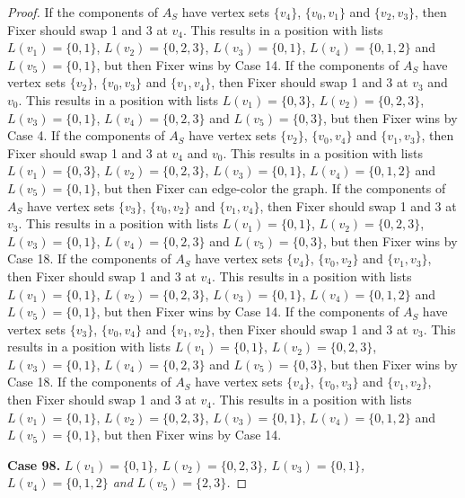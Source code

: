\documentclass[12pt]{amsart}
\theoremstyle{plain}
\theoremstyle{definition}
\theoremstyle{remark}
\begin{document}
\begin{proof}
If the components of $A_S$ have vertex sets $\{v_4\}$, $\{v_0, v_1\}$ and $\{v_2, v_3\}$, then Fixer should swap 1 and 3 at $v_4$. This results in a position with lists $L(v_1) = \{0, 1\}$, $L(v_2) = \{0, 2, 3\}$, $L(v_3) = \{0, 1\}$, $L(v_4) = \{0, 1, 2\}$ and $L(v_5) = \{0, 1\}$, but then Fixer wins by Case 14.
If the components of $A_S$ have vertex sets $\{v_2\}$, $\{v_0, v_3\}$ and $\{v_1, v_4\}$, then Fixer should swap 1 and 3 at $v_3$ and $v_0$. This results in a position with lists $L(v_1) = \{0, 3\}$, $L(v_2) = \{0, 2, 3\}$, $L(v_3) = \{0, 1\}$, $L(v_4) = \{0, 2, 3\}$ and $L(v_5) = \{0, 3\}$, but then Fixer wins by Case 4.
If the components of $A_S$ have vertex sets $\{v_2\}$, $\{v_0, v_4\}$ and $\{v_1, v_3\}$, then Fixer should swap 1 and 3 at $v_4$ and $v_0$. This results in a position with lists $L(v_1) = \{0, 3\}$, $L(v_2) = \{0, 2, 3\}$, $L(v_3) = \{0, 1\}$, $L(v_4) = \{0, 1, 2\}$ and $L(v_5) = \{0, 1\}$, but then Fixer can edge-color the graph.
If the components of $A_S$ have vertex sets $\{v_3\}$, $\{v_0, v_2\}$ and $\{v_1, v_4\}$, then Fixer should swap 1 and 3 at $v_3$. This results in a position with lists $L(v_1) = \{0, 1\}$, $L(v_2) = \{0, 2, 3\}$, $L(v_3) = \{0, 1\}$, $L(v_4) = \{0, 2, 3\}$ and $L(v_5) = \{0, 3\}$, but then Fixer wins by Case 18.
If the components of $A_S$ have vertex sets $\{v_4\}$, $\{v_0, v_2\}$ and $\{v_1, v_3\}$, then Fixer should swap 1 and 3 at $v_4$. This results in a position with lists $L(v_1) = \{0, 1\}$, $L(v_2) = \{0, 2, 3\}$, $L(v_3) = \{0, 1\}$, $L(v_4) = \{0, 1, 2\}$ and $L(v_5) = \{0, 1\}$, but then Fixer wins by Case 14.
If the components of $A_S$ have vertex sets $\{v_3\}$, $\{v_0, v_4\}$ and $\{v_1, v_2\}$, then Fixer should swap 1 and 3 at $v_3$. This results in a position with lists $L(v_1) = \{0, 1\}$, $L(v_2) = \{0, 2, 3\}$, $L(v_3) = \{0, 1\}$, $L(v_4) = \{0, 2, 3\}$ and $L(v_5) = \{0, 3\}$, but then Fixer wins by Case 18.
If the components of $A_S$ have vertex sets $\{v_4\}$, $\{v_0, v_3\}$ and $\{v_1, v_2\}$, then Fixer should swap 1 and 3 at $v_4$. This results in a position with lists $L(v_1) = \{0, 1\}$, $L(v_2) = \{0, 2, 3\}$, $L(v_3) = \{0, 1\}$, $L(v_4) = \{0, 1, 2\}$ and $L(v_5) = \{0, 1\}$, but then Fixer wins by Case 14.

\noindent\textbf{Case 98.  }\textit{$L(v_1) = \{0, 1\}$, $L(v_2) = \{0, 2, 3\}$, $L(v_3) = \{0, 1\}$, $L(v_4) = \{0, 1, 2\}$ and $L(v_5) = \{2, 3\}$.}


\end{proof}
\end{document}
